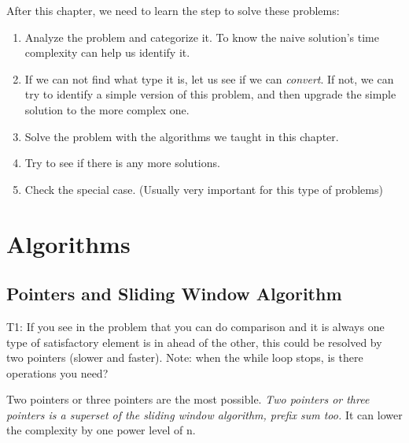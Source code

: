 \documentclass[../specific-algorithms.tex]{subfiles}
\begin{document}
After this chapter, we need to learn the step to solve these problems:
\begin{enumerate}
    \item Analyze the problem and categorize it.  To know the naive solution's time complexity can help us identify it.
    \item If we can not find what type it is, let us see if we can \textit{convert}. If not, we can try to identify a simple version of this problem, and then upgrade the simple solution to the more complex one. 
    \item Solve the problem with the algorithms we taught in this chapter.
    \item Try to see if there is any more solutions. 
    

    \item Check the special case. (Usually very important for this type of problems)
\end{enumerate}
\section{Algorithms}
\subsection{Pointers and Sliding Window Algorithm}
T1: If you see in the problem that you can do comparison and it is always one type of satisfactory element is in ahead of the other, this could be resolved by two pointers (slower and faster). Note: when the while loop stops, is there operations you need?

Two pointers or three pointers are the most possible. \textit{Two pointers or three pointers is a superset of the sliding window algorithm, prefix sum too.} It can lower the complexity by one power level of n. 
\end{document}
